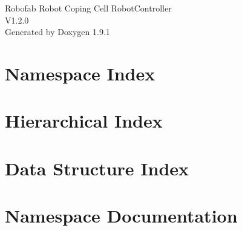 \let\mypdfximage\pdfximage\def\pdfximage{\immediate\mypdfximage}\documentclass[twoside]{book}
\newcommand{\+}{\discretionary{\mbox{\scriptsize$\hookleftarrow$}}{}{}}
\newcommand{\clearemptydoublepage}{%
  \newpage{\pagestyle{empty}\cleardoublepage}%
}
\begin{document}
\raggedbottom

\hypersetup{pageanchor=false,
             bookmarksnumbered=true,
             pdfencoding=unicode
            }
\begin{titlepage}
\vspace*{7cm}
\begin{center}%
{\Large Robofab Robot Coping Cell Robot\+Controller \\[1ex]\large V1.\+2.\+0 }\\
\vspace*{1cm}
{\large Generated by Doxygen 1.9.1}\\
\end{center}
\end{titlepage}
\clearemptydoublepage
{}
\tableofcontents
\clearemptydoublepage
{}
\hypersetup{pageanchor=true}

\chapter{Namespace Index}

\chapter{Hierarchical Index}

\chapter{Data Structure Index}

\chapter{Namespace Documentation}








\end{document}
